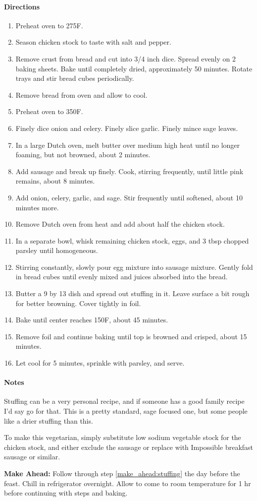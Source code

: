 \documentclass[12pt]{article}
\newenvironment*{directions}
	{
		\paragraph*{Directions}
		\begin{enumerate}
	}
	{
		\end{enumerate}
	}
\newenvironment*{notes}
	{
		\paragraph*{Notes}
		\begin{adjustwidth}{1cm}{}
	}
	{
		\end{adjustwidth}
	}
\begin{document}
	\begin{directions}
		\item Preheat oven to 275F.
		\item Season chicken stock to taste with salt and pepper.
		\item Remove crust from bread and cut into 3/4 inch dice. Spread evenly on 2 baking sheets. Bake until completely dried, approximately 50 minutes. Rotate trays and stir bread cubes periodically.
		\item Remove bread from oven and allow to cool.
		\item Preheat oven to 350F.
		\item Finely dice onion and celery. Finely slice garlic. Finely mince sage leaves.
		\item In a large Dutch oven, melt butter over medium high heat until no longer foaming, but not browned, about 2 minutes.
		\item Add sausage and break up finely. Cook, stirring frequently, until little pink remains, about 8 minutes.
		\item Add onion, celery, garlic, and sage. Stir frequently until softened, about 10 minutes more.
		\item Remove Dutch oven from heat and add about half the chicken stock.
		\item In a separate bowl, whisk remaining chicken stock, eggs, and 3 tbsp chopped parsley until homogeneous.
		\item Stirring constantly, slowly pour egg mixture into sausage mixture. Gently fold in bread cubes until evenly mixed and juices absorbed into the bread.
		\item Butter a 9 by 13 dish and spread out stuffing in it. Leave surface a bit rough for better browning. Cover tightly in foil. \label{make_ahead:stuffing}
		\item Bake until center reaches 150F, about 45 minutes.
		\item Remove foil and continue baking until top is browned and crisped, about 15 minutes.
		\item Let cool for 5 minutes, sprinkle with parsley, and serve.
	\end{directions}
	
	\begin{notes}
		Stuffing can be a very personal recipe, and if someone has a good family recipe I'd say go for that. This is a pretty standard, sage focused one, but some people like a drier stuffing than this.
		
		To make this vegetarian, simply substitute low sodium vegetable stock for the chicken stock, and either exclude the sausage or replace with Impossible breakfast sausage or similar.
		
		\textbf{Make Ahead:} Follow through step \ref{make_ahead:stuffing} the day before the feast. Chill in refrigerator overnight. Allow to come to room temperature for 1 hr before continuing with steps and baking.
	\end{notes}
	
\end{document}
